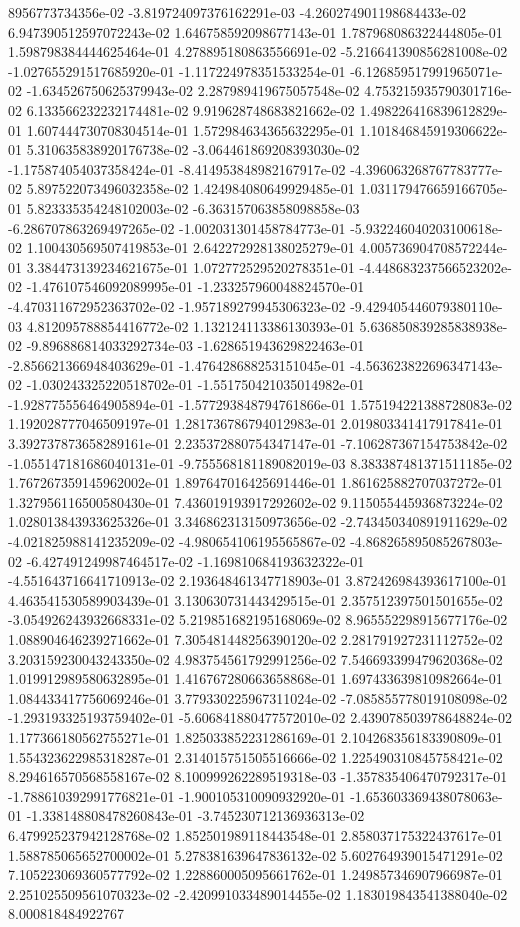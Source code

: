8956773734356e-02	-3.819724097376162291e-03	-4.260274901198684433e-02	6.947390512597072243e-02	1.646758592098677143e-01	1.787968086322444805e-01	1.598798384444625464e-01	4.278895180863556691e-02	-5.216641390856281008e-02	-1.027655291517685920e-01	-1.117224978351533254e-01	-6.126859517991965071e-02	-1.634526750625379943e-02	2.287989419675057548e-02	4.753215935790301716e-02	6.133566232232174481e-02	9.919628748683821662e-02	1.498226416839612829e-01	1.607444730708304514e-01	1.572984634365632295e-01	1.101846845919306622e-01	5.310635838920176738e-02	-3.064461869208393030e-02	-1.175874054037358424e-01	-8.414953848982167917e-02	-4.396063268767783777e-02	5.897522073496032358e-02	1.424984080649929485e-01	1.031179476659166705e-01	5.823335354248102003e-02	-6.363157063858098858e-03	-6.286707863269497265e-02	-1.002031301458784773e-01	-5.932246040203100618e-02	1.100430569507419853e-01	2.642272928138025279e-01	4.005736904708572244e-01	3.384473139234621675e-01	1.072772529520278351e-01	-4.448683237566523202e-02	-1.476107546092089995e-01	-1.233257960048824570e-01	-4.470311672952363702e-02	-1.957189279945306323e-02	-9.429405446079380110e-03	4.812095788854416772e-02	1.132124113386130393e-01	5.636850839285838938e-02	-9.896886814033292734e-03	-1.628651943629822463e-01	-2.856621366948403629e-01	-1.476428688253151045e-01	-4.563623822696347143e-02	-1.030243325220518702e-01	-1.551750421035014982e-01	-1.928775556464905894e-01	-1.577293848794761866e-01	1.575194221388728083e-02	1.192028777046509197e-01	1.281736786794012983e-01	2.019803341417917841e-01	3.392737873658289161e-01	2.235372880754347147e-01	-7.106287367154753842e-02	-1.055147181686040131e-01	-9.755568181189082019e-03	8.383387481371511185e-02	1.767267359145962002e-01	1.897647016425691446e-01	1.861625882707037272e-01	1.327956116500580430e-01	7.436019193917292602e-02	9.115055445936873224e-02	1.028013843933625326e-01	3.346862313150973656e-02	-2.743450340891911629e-02	-4.021825988141235209e-02	-4.980654106195565867e-02	-4.868265895085267803e-02	-6.427491249987464517e-02	-1.169810684193632322e-01	-4.551643716641710913e-02	2.193648461347718903e-01	3.872426984393617100e-01	4.463541530589903439e-01	3.130630731443429515e-01	2.357512397501501655e-02	-3.054926243932668331e-02	5.219851682195168069e-02	8.965552298915677176e-02	1.088904646239271662e-01	7.305481448256390120e-02	2.281791927231112752e-02	3.203159230043243350e-02	4.983754561792991256e-02	7.546693399479620368e-02	1.019912989580632895e-01	1.416767280663658868e-01	1.697433639810982664e-01	1.084433417756069246e-01	3.779330225967311024e-02	-7.085855778019108098e-02	-1.293193325193759402e-01	-5.606841880477572010e-02	2.439078503978648824e-02	1.177366180562755271e-01	1.825033852231286169e-01	2.104268356183390809e-01	1.554323622985318287e-01	2.314015751505516666e-02	1.225490310845758421e-02	8.294616570568558167e-02	8.100999262289519318e-03	-1.357835406470792317e-01	-1.788610392991776821e-01	-1.900105310090932920e-01	-1.653603369438078063e-01	-1.338148808478260843e-01	-3.745230712136936313e-02	6.479925237942128768e-02	1.852501989118443548e-01	2.858037175322437617e-01	1.588785065652700002e-01	5.278381639647836132e-02	5.602764939015471291e-02	7.105223069360577792e-02	1.228860005095661762e-01	1.249857346907966987e-01	2.251025509561070323e-02	-2.420991033489014455e-02	1.183019843541388040e-02	8.000818484922767